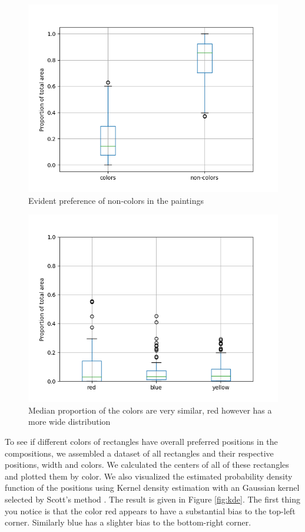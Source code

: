\documentclass[serif,article,noparskip]{agse-thesis}
\begin{document}
\begin{figure}
\includegraphics[width=\linewidth]{images/colors-non-colors.png}
\caption{Evident preference of non-colors in the paintings}
\label{fig:colors-noncolors}
\end{figure}

\begin{figure} \includegraphics[width=\linewidth]{images/colors-rby.png}
\caption{Median proportion of the colors are very similar, red however has a
more wide distribution} \label{fig:colors-rby} \end{figure}

To see if different colors of rectangles have overall preferred positions in the
compositions, we assembled a dataset of all rectangles and their respective
positions, width and colors. We calculated the centers of all of these
rectangles and plotted them by color. We also visualized the estimated
probability density function of the positions using Kernel density estimation
with an Gaussian kernel selected by Scott's method \cite{Terrell1992}. The
result is given in Figure \ref{fig:kde}. The first thing you notice is that the
color red appears to have a substantial bias to the top-left corner. Similarly
blue has a slighter bias to the bottom-right corner.
\end{document}
